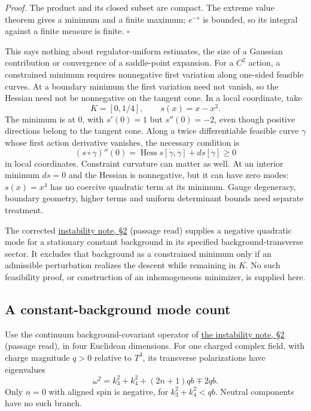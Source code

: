 \documentclass[11pt,a4paper]{article}
\begin{document}
\emph{Proof.} The product and its closed subset are compact. The extreme
value theorem gives a minimum and a finite maximum; \(e^{-s}\) is
bounded, so its integral against a finite measure is finite. \(\square\)

This says nothing about regulator-uniform estimates, the size of a
Gaussian contribution or convergence of a saddle-point expansion. For a
\(C^2\) action, a constrained minimum requires nonnegative first
variation along one-sided feasible curves. At a boundary minimum the
first variation need not vanish, so the Hessian need not be nonnegative
on the tangent cone. In a local coordinate, take
\[K=[0,1/4],\qquad s(x)=x-x^2.\] The minimum is at \(0\), with
\(s'(0)=1\) but \(s''(0)=-2\), even though positive directions belong to
the tangent cone. Along a twice differentiable feasible curve \(\gamma\)
whose first action derivative vanishes, the necessary condition is
\[(s\circ\gamma)''(0)
=\operatorname{Hess}s[\dot\gamma,\dot\gamma]
+ds[\ddot\gamma]\ge0\] in local coordinates. Constraint curvature can
matter as well. At an interior minimum \(ds=0\) and the Hessian is
nonnegative, but it can have zero modes: \(s(x)=x^4\) has no coercive
quadratic term at its minimum. Gauge degeneracy, boundary geometry,
higher terms and uniform determinant bounds need separate treatment.

The corrected
\href{flow-jacobian-truncation-error.md\#instability-of-the-full-background-generator}{instability
note, §2} (passage read) supplies a negative quadratic mode for a
stationary constant background in its specified background-transverse
sector. It excludes that background as a constrained minimum only if an
admissible perturbation realizes the descent while remaining in \(K\).
No such feasibility proof, or construction of an inhomogeneous
minimizer, is supplied here.

\hypertarget{a-constant-background-mode-count}{%
\subsection{A constant-background mode
count}\label{a-constant-background-mode-count}}

Use the continuum background-covariant operator of
\href{flow-jacobian-truncation-error.md\#instability-of-the-full-background-generator}{the
instability note, §2} (passage read), in four Euclidean dimensions. For
one charged complex field, with charge magnitude \(q>0\) relative to
\(T^3\), its transverse polarizations have eigenvalues
\[\omega^2=k_3^2+k_4^2+(2n+1)qb\mp2qb.\] Only \(n=0\) with aligned spin
is negative, for \(k_3^2+k_4^2<qb\). Neutral components have no such
branch.
\end{document}
